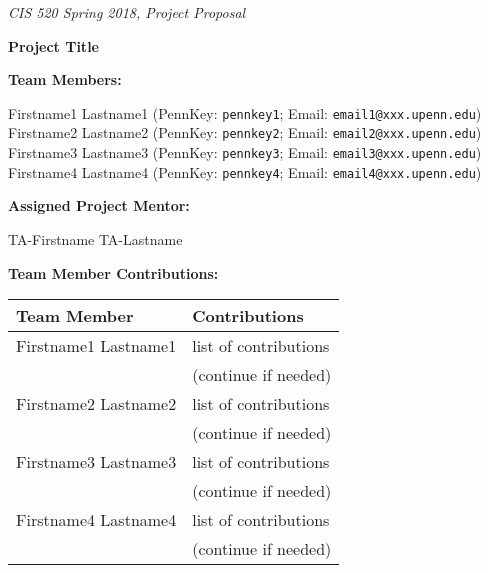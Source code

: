 \documentclass[twoside,11pt]{article}
\renewcommand{\>}{{\rightarrow}}
\newcommand{\1}{{\mathbf 1}}
\newcommand{\0}{{\mathbf 0}}
\begin{document}

\emph{\footnotesize{CIS 520 Spring 2018, Project Proposal}}


\vspace{12pt}

\textbf{\Large{Project Title}}

\vspace{1cm}

\textbf{Team Members:}

Firstname1 Lastname1 (PennKey: \texttt{pennkey1}; Email: \texttt{email1@xxx.upenn.edu}) \\
Firstname2 Lastname2 (PennKey: \texttt{pennkey2}; Email: \texttt{email2@xxx.upenn.edu}) \\
Firstname3 Lastname3 (PennKey: \texttt{pennkey3}; Email: \texttt{email3@xxx.upenn.edu}) \\
Firstname4 Lastname4 (PennKey: \texttt{pennkey4}; Email: \texttt{email4@xxx.upenn.edu})


\vspace{2cm}


\textbf{Assigned Project Mentor:}

TA-Firstname TA-Lastname

\vspace{1cm}

\textbf{Team Member Contributions:}

\begin{center}
\begin{tabular}{|l|l|}
\hline
Team Member & Contributions \\
\hline
Firstname1 Lastname1 & list of contributions \\
	& (continue if needed) \\
\hline
Firstname2 Lastname2 & list of contributions \\
	& (continue if needed) \\
\hline
Firstname3 Lastname3 & list of contributions \\
	& (continue if needed) \\
\hline
Firstname4 Lastname4 & list of contributions \\
	& (continue if needed) \\
\hline
\end{tabular}
\end{center}
\end{document}
